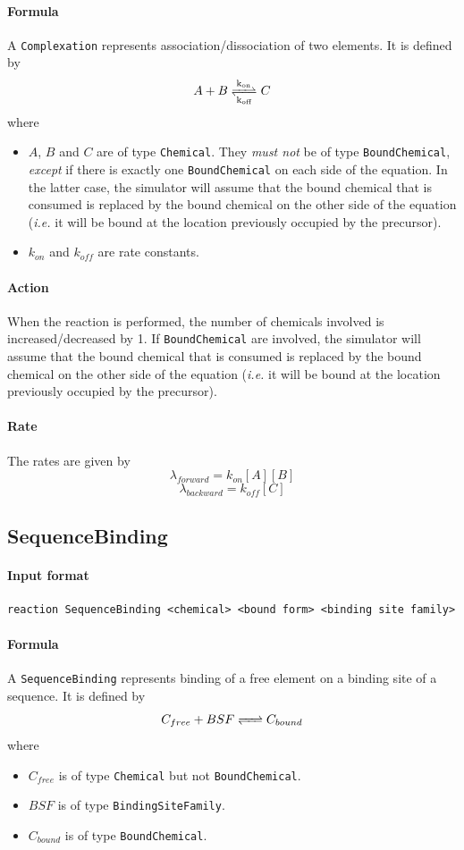 \documentclass[12pt]{article}
\theoremstyle{definition}
\theoremstyle{remark}
\numberwithin{equation}{section}
\newcommand{\reactionRev}[4]{#1 \ce{<=>[#3][#4]} #2}
\begin{document}
\paragraph{Formula} A \texttt{Complexation} represents association/dissociation of two elements. It is defined by
$$
	\reactionRev{A + B}{C}{k_{on}}{k_{off}}
$$
where
\begin{itemize}
	\item $A$, $B$ and $C$ are of type \texttt{Chemical}. They \emph{must not} be of type \texttt{BoundChemical}, \emph{except} if there is exactly one \texttt{BoundChemical} on each side of the equation. In the latter case, the simulator will assume that the bound chemical that is consumed is replaced by the bound chemical on the other side of the equation (\textit{i.e.} it will be bound at the location previously occupied by the precursor).
	\item $k_{on}$ and $k_{off}$ are rate constants.
\end{itemize}

\paragraph{Action} When the reaction is performed, the number of chemicals involved is increased/decreased by 1. If \texttt{BoundChemical} are involved, the simulator will assume that the bound chemical that is consumed is replaced by the bound chemical on the other side of the equation (\textit{i.e.} it will be bound at the location previously occupied by the precursor).

\paragraph{Rate} The rates are given by
$$
	\lambda_{forward} = k_{on} [A][B]
$$
$$
	\lambda_{backward} = k_{off} [C]
$$

\subsection{SequenceBinding}
\paragraph{Input format}
\begin{verbatim}
reaction SequenceBinding <chemical> <bound form> <binding site family>
\end{verbatim}

\paragraph{Formula} A \texttt{SequenceBinding} represents binding of a free element on a binding site of a sequence. It is defined by
$$
	\reactionRev{C_{free} + BSF}{C_{bound}}{}{}
$$
where
\begin{itemize}
	\item $C_{free}$ is of type \texttt{Chemical} but not \texttt{BoundChemical}.
	\item $BSF$ is of type \texttt{BindingSiteFamily}.
	\item $C_{bound}$ is of type \texttt{BoundChemical}.
\end{itemize}
\end{document}

